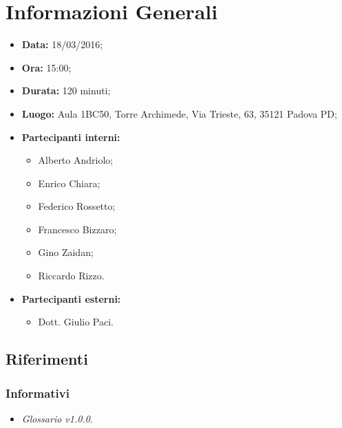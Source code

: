 \section{Informazioni Generali}

\begin{itemize}
\item \textbf{Data:} 18/03/2016;
\item \textbf{Ora:} 15:00;
\item \textbf{Durata:} 120 minuti;
\item \textbf{Luogo:} Aula 1BC50, Torre Archimede, Via Trieste, 63, 35121 Padova PD;
\item \textbf{Partecipanti interni:} \GRUPPO
	\begin{itemize}
	\item Alberto Andriolo;
	\item Enrico Chiara;
	\item Federico Rossetto;
	\item Francesco Bizzaro;
	\item Gino Zaidan;
	\item Riccardo Rizzo.
	\end{itemize}
\item \textbf{Partecipanti esterni:} \AZIENDA
	\begin{itemize}
	\item Dott. Giulio Paci.
	\end{itemize}
\end{itemize}

\subsection{Riferimenti}

\subsubsection{Informativi}
\begin{itemize}
	\item \textit{Glossario v1.0.0}.
\end{itemize}

\newpage










